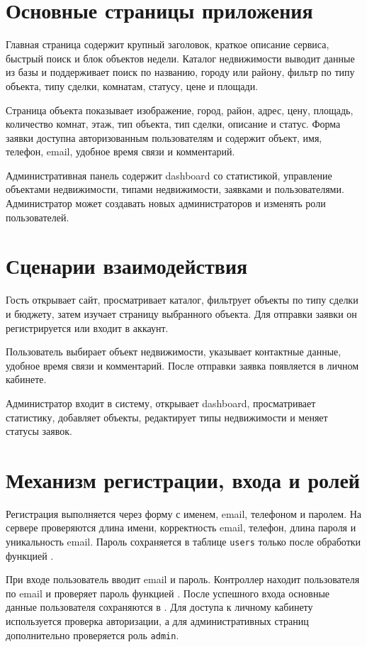 \documentclass[12pt,a4paper]{article}
\begin{document}
\section{Основные страницы приложения}

Главная страница содержит крупный заголовок, краткое описание сервиса, быстрый поиск и блок объектов недели. Каталог недвижимости выводит данные из базы и поддерживает поиск по названию, городу или району, фильтр по типу объекта, типу сделки, комнатам, статусу, цене и площади.

Страница объекта показывает изображение, город, район, адрес, цену, площадь, количество комнат, этаж, тип объекта, тип сделки, описание и статус. Форма заявки доступна авторизованным пользователям и содержит объект, имя, телефон, email, удобное время связи и комментарий.

Административная панель содержит dashboard со статистикой, управление объектами недвижимости, типами недвижимости, заявками и пользователями. Администратор может создавать новых администраторов и изменять роли пользователей.

\section{Сценарии взаимодействия}

Гость открывает сайт, просматривает каталог, фильтрует объекты по типу сделки и бюджету, затем изучает страницу выбранного объекта. Для отправки заявки он регистрируется или входит в аккаунт.

Пользователь выбирает объект недвижимости, указывает контактные данные, удобное время связи и комментарий. После отправки заявка появляется в личном кабинете.

Администратор входит в систему, открывает dashboard, просматривает статистику, добавляет объекты, редактирует типы недвижимости и меняет статусы заявок.

\section{Механизм регистрации, входа и ролей}

Регистрация выполняется через форму с именем, email, телефоном и паролем. На сервере проверяются длина имени, корректность email, телефон, длина пароля и уникальность email. Пароль сохраняется в таблице \texttt{users} только после обработки функцией .

При входе пользователь вводит email и пароль. Контроллер находит пользователя по email и проверяет пароль функцией . После успешного входа основные данные пользователя сохраняются в . Для доступа к личному кабинету используется проверка авторизации, а для административных страниц дополнительно проверяется роль \texttt{admin}.
\end{document}
